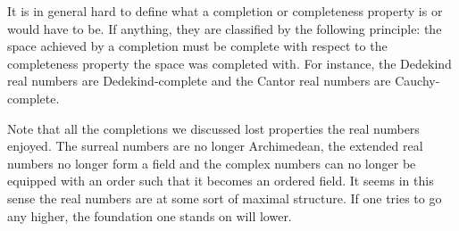 \documentclass[../main.tex]{subfiles}
\begin{document}
It is in general hard to define what a completion or completeness property is or would have to be. If anything, they are classified by the following principle: the space achieved by a completion must be complete with respect to the completeness property the space was completed with. For instance, the Dedekind real numbers are Dedekind-complete and the Cantor real numbers are Cauchy-complete.

Note that all the completions we discussed lost properties the real numbers enjoyed. The surreal numbers are no longer Archimedean, the extended real numbers no longer form a field and the complex numbers can no longer be equipped with an order such that it becomes an ordered field. It seems in this sense the real numbers are at some sort of maximal structure. If one tries to go any higher, the foundation one stands on will lower.
\end{document}
